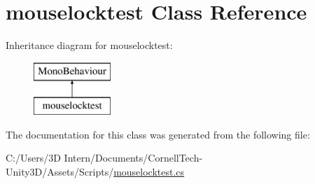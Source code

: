 \hypertarget{classmouselocktest}{}\section{mouselocktest Class Reference}
\label{classmouselocktest}
Inheritance diagram for mouselocktest\+:\begin{figure}[H]
\begin{center}
\leavevmode
\includegraphics[height=2.000000cm]{classmouselocktest}
\end{center}
\end{figure}


The documentation for this class was generated from the following file\+:\begin{DoxyCompactItemize}
\item 
C\+:/\+Users/3\+D Intern/\+Documents/\+Cornell\+Tech-\/\+Unity3\+D/\+Assets/\+Scripts/\hyperlink{mouselocktest_8cs}{mouselocktest.\+cs}\end{DoxyCompactItemize}
